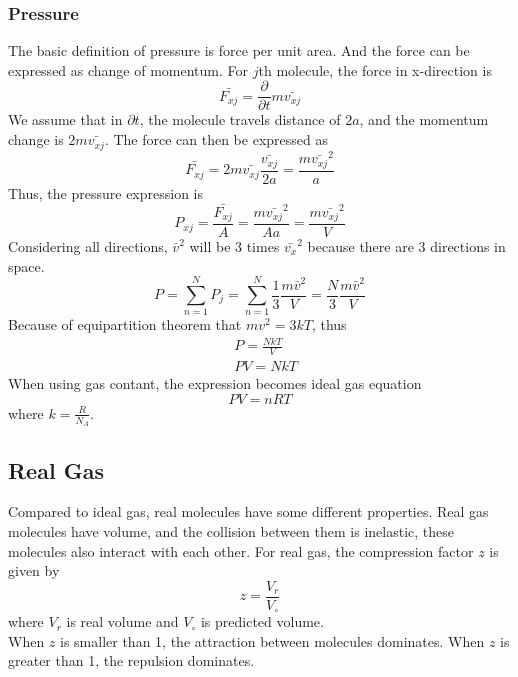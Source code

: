 \documentclass[letterpaper]{article}
\begin{document}
\subsubsection*{Pressure}
The basic definition of pressure is force per unit area. And the force can be expressed as change of momentum.
For $j$th molecule, the force in x-direction is
\begin{equation*}
    \bar{F_{xj}}=\frac{\partial}{\partial t}m\bar{v_{xj}}
\end{equation*}
We assume that in $\partial t$, the molecule travels distance of $2a$, and the momentum change is $2m\bar{v_{xj}}$.
The force can then be expressed as
\begin{equation*}
    \bar{F_{xj}}=2m\bar{v_{xj}}\frac{\bar{v_{xj}}}{2a}=\frac{m\bar{v_{xj}}^2}{a}
\end{equation*}
Thus, the pressure expression is
\begin{equation*}
    P_{xj}=\frac{\bar{F_{xj}}}{A}=\frac{m\bar{v_{xj}}^2}{Aa}=\frac{m\bar{v_{xj}}^2}{V}
\end{equation*}
Considering all directions, $\bar{v}^2$ will be 3 times $\bar{v_x}^2$ because there are 3 directions in space.
\begin{equation*}
    P=\sum_{n=1}^{N}P_j=\sum_{n=1}^{N}\frac{1}{3}\frac{m\bar{v}^2}{V}=\frac{N}{3}\frac{m\bar{v}^2}{V}
\end{equation*}
Because of equipartition theorem that $mv^2=3kT$, thus
\begin{equation*}
    \begin{aligned}
         & P=\frac{NkT}{V} \\
         & PV=NkT
    \end{aligned}
\end{equation*}
When using gas contant, the expression becomes ideal gas equation
\begin{equation*}
    PV=nRT
\end{equation*}
where $k=\frac{R}{N_A}$.
\subsection*{Real Gas}
Compared to ideal gas, real molecules have some different properties. Real gas molecules have volume, and the collision
between them is inelastic, these molecules also interact with each other.
For real gas, the compression factor $z$ is given by
\begin{equation*}
    z=\frac{V_r}{V_\circ}
\end{equation*}
where $V_r$ is real volume and $V_\circ$ is predicted volume.\\
When $z$ is smaller than 1, the attraction between molecules dominates. When $z$ is greater than 1, the repulsion dominates.
\end{document}

